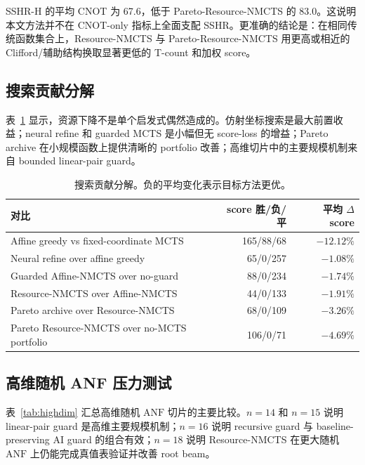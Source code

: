 \documentclass[UTF8,fontset=macnew,11pt]{ctexart}
\newcommand{\method}{Resource-NMCTS}
\newcommand{\pareto}{Pareto-Resource-NMCTS}
\newcommand{\anf}{\ensuremath{\mathrm{ANF}}}
\begin{document}
SSHR-H 的平均 CNOT 为 67.6，低于 \pareto{} 的 83.0。这说明本文方法并不在 CNOT-only 指标上全面支配 SSHR。更准确的结论是：在相同传统函数集合上，\method{} 与 \pareto{} 用更高或相近的 Clifford/辅助结构换取显著更低的 T-count 和加权 score。

\subsection{搜索贡献分解}

表~\ref{tab:contribution} 显示，资源下降不是单个启发式偶然造成的。仿射坐标搜索是最大前置收益；neural refine 和 guarded MCTS 是小幅但无 score-loss 的增益；Pareto archive 在小规模函数上提供清晰的 portfolio 改善；高维切片中的主要规模机制来自 bounded linear-pair guard。

\begin{table}[t]
\centering
\small
\caption{搜索贡献分解。负的平均变化表示目标方法更优。}
\label{tab:contribution}
\begin{tabularx}{\linewidth}{>{\raggedright\arraybackslash}Xrr}
\toprule
对比 & score 胜/负/平 & 平均 $\Delta$ score \\
\midrule
Affine greedy vs fixed-coordinate MCTS & 165/88/68 & $-12.12\%$ \\
Neural refine over affine greedy & 65/0/257 & $-1.08\%$ \\
Guarded Affine-NMCTS over no-guard & 88/0/234 & $-1.74\%$ \\
Resource-NMCTS over Affine-NMCTS & 44/0/133 & $-1.91\%$ \\
Pareto archive over Resource-NMCTS & 68/0/109 & $-3.26\%$ \\
Pareto Resource-NMCTS over no-MCTS portfolio & 106/0/71 & $-4.69\%$ \\
\bottomrule
\end{tabularx}
\end{table}

\subsection{高维随机 ANF 压力测试}

表~\ref{tab:highdim} 汇总高维随机 \anf{} 切片的主要比较。$n=14$ 和 $n=15$ 说明 linear-pair guard 是高维主要规模机制；$n=16$ 说明 recursive guard 与 baseline-preserving AI guard 的组合有效；$n=18$ 说明 \method{} 在更大随机 \anf{} 上仍能完成真值表验证并改善 root beam。
\end{document}
